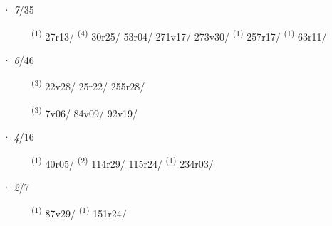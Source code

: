 \ENTRYEND
\noindent{} · \textit{7}/35 \LEMMALINE
\begin{description}
    \item[]  \textsuperscript{(1)} \mbox{27r13/} \CASEBREAK {} \textsuperscript{(4)} \mbox{30r25/} \mbox{53r04/} \mbox{271v17/} \mbox{273v30/} \textsuperscript{(1)} \mbox{257r17/} \CASEBREAK {} \textsuperscript{(1)} \mbox{63r11/}
\end{description}
\ENTRYEND
\noindent{} · \textit{6}/46 \LEMMALINE
\begin{description}
    \item[]  \textsuperscript{(3)} \mbox{22v28/} \mbox{25r22/} \mbox{255r28/}
    \item[]  \textsuperscript{(3)} \mbox{7v06/} \mbox{84v09/} \mbox{92v19/}
\end{description}
\ENTRYEND
\noindent{} · \textit{4}/16 \LEMMALINE
\begin{description}
    \item[]  \textsuperscript{(1)} \mbox{40r05/} \textsuperscript{(2)} \mbox{114r29/} \mbox{115r24/} \CASEBREAK {} \textsuperscript{(1)} \mbox{234r03/}
\end{description}
\ENTRYEND
\noindent{} · \textit{2}/7 \LEMMALINE
\begin{description}
    \item[]  \textsuperscript{(1)} \mbox{87v29/} \CASEBREAK {} \textsuperscript{(1)} \mbox{151r24/}
\end{description}
